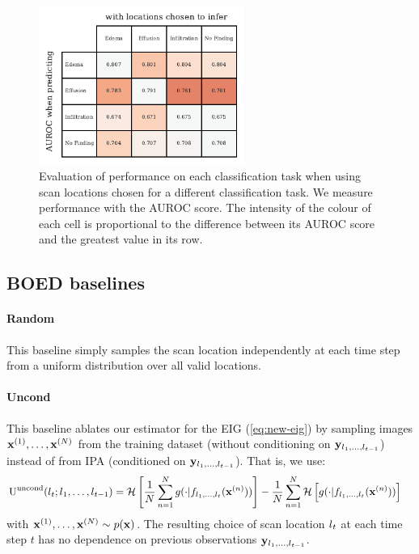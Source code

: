 \begin{figure}[t]
  \centering
  \includegraphics[width=0.6\textwidth]{figs/cigcvae/table-AUROC-boed}
  \caption{Evaluation of performance on each classification task when using scan locations chosen for a different classification task. We measure performance with the AUROC score. The intensity of the
    colour of each cell is proportional to the difference between its AUROC score and
    the greatest value in its row.}
  \label{fig:cigcvae-boed-correlations}
\end{figure}

\subsection{BOED baselines}
\paragraph{Random}
This baseline simply samples the scan location independently at each time step
from a uniform distribution over all valid locations.

\paragraph{Uncond}
This baseline ablates our estimator for the EIG (\cref{eq:new-eig}) by sampling
images ${\mathbf{x}}^{(1)},\ldots,{\mathbf{x}}^{(N)}$ from the training dataset (without
conditioning on ${\mathbf{y}}_{l{}_1,\ldots,l{}_{t-1}}$) instead of from IPA
(conditioned on ${\mathbf{y}}_{l{}_1,\ldots,l{}_{t-1}}$). That is, we use:
\begin{align}
  \label{eq:uncond}
  \text{U}^{\text{uncond}}(l{}_t; l{}_1,&\ldots,l{}_{t-1}) = \mathcal{H} \left[ \frac{1}{N} \sum_{n=1}^N g(\cdot|f_{l{}_1,\ldots,l{}_t}({\mathbf{x}}^{(n)})) \right] - \frac{1}{N} \sum_{n=1}^N  \mathcal{H} \left[ g(\cdot|f_{l{}_1,\ldots,l{}_t}({\mathbf{x}}^{(n)})) \right]
\end{align}
with ${\mathbf{x}}^{(1)},\ldots,{\mathbf{x}}^{(N)} \sim p({\mathbf{x}})$. The resulting choice of scan
location $l{}_t$ at each time step $t$ has no dependence on previous
observations ${\mathbf{y}}_{l{}_1,\ldots,l{}_{t-1}}$.

